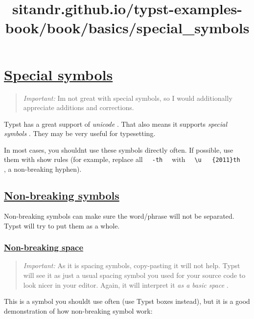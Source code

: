 \title{sitandr.github.io/typst-examples-book/book/basics/special_symbols}

\section{\texorpdfstring{\hyperref[special-symbols]{Special
symbols}}{Special symbols}}\label{special-symbols}

\begin{quote}
\emph{Important:} I\textquotesingle m not great with special symbols, so
I would additionally appreciate additions and corrections.
\end{quote}

Typst has a great support of \emph{unicode} . That also means it
supports \emph{special symbols} . They may be very useful for
typesetting.

In most cases, you shouldn\textquotesingle t use these symbols directly
often. If possible, use them with show rules (for example, replace all
\texttt{\ }{\texttt{\ -th\ }}\texttt{\ } with
\texttt{\ }{\texttt{\ \textbackslash{}u\ }}\texttt{\ }{\texttt{\ \{2011\}th\ }}\texttt{\ }
, a non-breaking hyphen).

\subsection{\texorpdfstring{\hyperref[non-breaking-symbols]{Non-breaking
symbols}}{Non-breaking symbols}}\label{non-breaking-symbols}

Non-breaking symbols can make sure the word/phrase will not be
separated. Typst will try to put them as a whole.

\subsubsection{\texorpdfstring{\hyperref[non-breaking-space]{Non-breaking
space}}{Non-breaking space}}\label{non-breaking-space}

\begin{quote}
\emph{Important:} As it is spacing symbols, copy-pasting it will not
help. Typst will see it as just a usual spacing symbol you used for your
source code to look nicer in your editor. Again, it will interpret it
\emph{as a basic space} .
\end{quote}

This is a symbol you should\textquotesingle t use often (use Typst boxes
instead), but it is a good demonstration of how non-breaking symbol
work:

